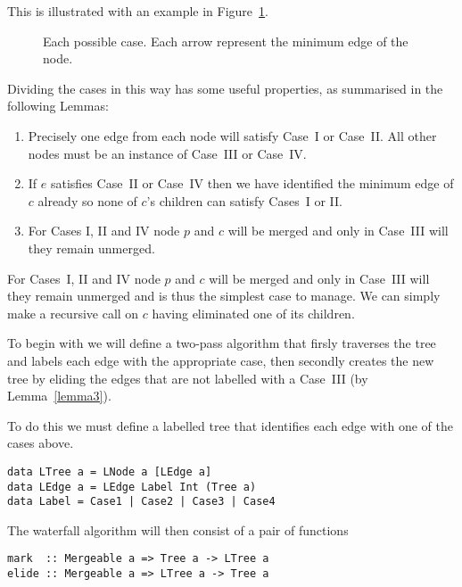 \documentclass{jfp}
\begin{document}
This is illustrated with an example in Figure~\ref{fig:cases}.

\begin{figure}
\centering
\ifpdf
\else
\fi
\caption{Each possible case. Each arrow represent the minimum edge of
the node.}
\label{fig:cases}
\end{figure}


Dividing the cases in this way has some useful properties, as
summarised in the following Lemmas:
\begin{enumerate}

\item Precisely one edge from each node will satisfy Case~I or
  Case~II. All other nodes must be an instance of Case~III or Case~IV.
\label{lemma1}

\item If $e$ satisfies Case~II or Case~IV then we have identified the
  minimum edge of $c$ already so none of $c$'s children can satisfy
  Cases~I or II.
\label{lemma2}

\item For Cases I, II and IV node $p$ and $c$ will be merged and only
  in Case~III will they remain unmerged.
\label{lemma3}

\end{enumerate}

For Cases~I, II and IV node $p$ and $c$ will be merged and only in Case~III
will they remain unmerged and is thus the simplest case to manage.  We
can simply make a recursive call on $c$ having eliminated one of its
children.

To begin with we will define a two-pass algorithm that firsly
traverses the tree and labels each edge with the appropriate case,
then secondly creates the new tree by eliding the edges that are not
labelled with a Case~III (by Lemma~\ref{lemma3}).

To do this we must define a labelled tree that identifies each edge
with one of the cases above.


\begin{verbatim}
data LTree a = LNode a [LEdge a]
data LEdge a = LEdge Label Int (Tree a)
data Label = Case1 | Case2 | Case3 | Case4
\end{verbatim}

The waterfall algorithm will then consist of a pair of functions

\begin{verbatim}
mark  :: Mergeable a => Tree a -> LTree a
elide :: Mergeable a => LTree a -> Tree a
\end{verbatim}
\end{document}
